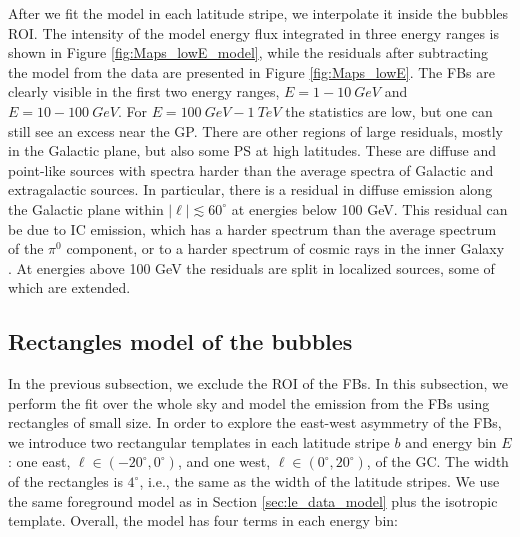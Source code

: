 After we fit the model in each latitude stripe, we interpolate it inside the bubbles ROI.
The intensity of the model energy flux integrated in three energy ranges
is shown in Figure \ref{fig:Maps_lowE_model},
while the residuals after subtracting the model from the data are presented in Figure \ref{fig:Maps_lowE}.
The FBs are clearly visible in the first two energy ranges, $E = 1 - \SI{10}{GeV}$ and $E = 10 - \SI{100}{GeV}$.
For $E = \SI{100}{GeV} - \SI{1}{TeV}$ the statistics are low, but one can still see an excess near the GP.
There are other regions of large residuals, mostly in the Galactic plane, but also some PS at high latitudes.
These are diffuse and point-like sources with spectra harder than the average spectra of Galactic and
extragalactic sources.
In particular, there is a residual in diffuse emission along the Galactic plane within $|\ell | \lesssim 60^\circ$ at energies below 100 GeV.
This residual can be due to IC emission, which has a harder spectrum than the average spectrum of the $\pi^0$ component,
or to a harder spectrum of cosmic rays in the inner Galaxy \citep{2015PhRvD..91h3012G, 2016ApJS..223...26A}.
At energies above 100 GeV the residuals are split in localized sources, some of which are extended.

\subsection{Rectangles model of the bubbles}
\label{sec:box_model}

In the previous subsection, we exclude the ROI of the FBs.
In this subsection, we perform the fit over the whole sky and model the emission from the FBs using rectangles of small size.
In order to explore the east-west asymmetry of the FBs, 
we introduce two rectangular templates in each latitude stripe $b$ and energy bin $E$: 
one east, $\ell \in (-20^\circ, 0^\circ)$, and one west, $\ell \in (0^\circ, 20^\circ)$, of the GC.
The width of the rectangles is $4^\circ$, i.e., the same as the width of the latitude stripes.
We use the same foreground model as in Section \ref{sec:le_data_model} plus the isotropic template.
Overall, the model has four terms in each energy bin:

